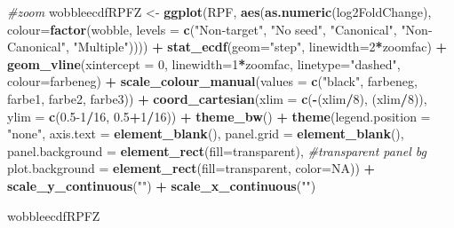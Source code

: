\documentclass[
]{article}
\newenvironment{Shaded}{\begin{snugshade}}{\end{snugshade}}
\newcommand{\AttributeTok}[1]{\textcolor[rgb]{0.13,0.29,0.53}{#1}}
\newcommand{\CommentTok}[1]{\textcolor[rgb]{0.56,0.35,0.01}{\textit{#1}}}
\newcommand{\ConstantTok}[1]{\textcolor[rgb]{0.56,0.35,0.01}{#1}}
\newcommand{\DecValTok}[1]{\textcolor[rgb]{0.00,0.00,0.81}{#1}}
\newcommand{\FloatTok}[1]{\textcolor[rgb]{0.00,0.00,0.81}{#1}}
\newcommand{\FunctionTok}[1]{\textcolor[rgb]{0.13,0.29,0.53}{\textbf{#1}}}
\newcommand{\NormalTok}[1]{#1}
\newcommand{\OtherTok}[1]{\textcolor[rgb]{0.56,0.35,0.01}{#1}}
\newcommand{\SpecialCharTok}[1]{\textcolor[rgb]{0.81,0.36,0.00}{\textbf{#1}}}
\newcommand{\StringTok}[1]{\textcolor[rgb]{0.31,0.60,0.02}{#1}}
\begin{document}
\begin{Shaded}
\begin{Highlighting}[]
\CommentTok{\#zoom}
\NormalTok{wobbleecdfRPFZ }\OtherTok{\textless{}{-}} \FunctionTok{ggplot}\NormalTok{(RPF, }\FunctionTok{aes}\NormalTok{(}\FunctionTok{as.numeric}\NormalTok{(log2FoldChange), }\AttributeTok{colour=}\FunctionTok{factor}\NormalTok{(wobble, }\AttributeTok{levels =} \FunctionTok{c}\NormalTok{(}\StringTok{"Non{-}target"}\NormalTok{, }\StringTok{"No seed"}\NormalTok{, }\StringTok{"Canonical"}\NormalTok{, }\StringTok{"Non{-}Canonical"}\NormalTok{, }\StringTok{"Multiple"}\NormalTok{)))) }\SpecialCharTok{+} 
  \FunctionTok{stat\_ecdf}\NormalTok{(}\AttributeTok{geom=}\StringTok{"step"}\NormalTok{, }\AttributeTok{linewidth=}\DecValTok{2}\SpecialCharTok{*}\NormalTok{zoomfac) }\SpecialCharTok{+}
  \FunctionTok{geom\_vline}\NormalTok{(}\AttributeTok{xintercept =} \DecValTok{0}\NormalTok{, }\AttributeTok{linewidth=}\DecValTok{1}\SpecialCharTok{*}\NormalTok{zoomfac, }\AttributeTok{linetype=}\StringTok{"dashed"}\NormalTok{, }\AttributeTok{colour=}\NormalTok{farbeneg) }\SpecialCharTok{+}
  \FunctionTok{scale\_colour\_manual}\NormalTok{(}\AttributeTok{values =} \FunctionTok{c}\NormalTok{(}\StringTok{"black"}\NormalTok{, farbeneg, farbe1, farbe2, farbe3)) }\SpecialCharTok{+}
  \FunctionTok{coord\_cartesian}\NormalTok{(}\AttributeTok{xlim =} \FunctionTok{c}\NormalTok{(}\SpecialCharTok{{-}}\NormalTok{(xlim}\SpecialCharTok{/}\DecValTok{8}\NormalTok{), (xlim}\SpecialCharTok{/}\DecValTok{8}\NormalTok{)), }\AttributeTok{ylim =} \FunctionTok{c}\NormalTok{(}\FloatTok{0.5}\DecValTok{{-}1}\SpecialCharTok{/}\DecValTok{16}\NormalTok{, }\FloatTok{0.5}\SpecialCharTok{+}\DecValTok{1}\SpecialCharTok{/}\DecValTok{16}\NormalTok{)) }\SpecialCharTok{+} 
  \FunctionTok{theme\_bw}\NormalTok{() }\SpecialCharTok{+}
  \FunctionTok{theme}\NormalTok{(}\AttributeTok{legend.position =} \StringTok{"none"}\NormalTok{, }\AttributeTok{axis.text =} \FunctionTok{element\_blank}\NormalTok{(), }\AttributeTok{panel.grid =} \FunctionTok{element\_blank}\NormalTok{(),}
        \AttributeTok{panel.background =} \FunctionTok{element\_rect}\NormalTok{(}\AttributeTok{fill=}\StringTok{\textquotesingle{}transparent\textquotesingle{}}\NormalTok{), }\CommentTok{\#transparent panel bg}
        \AttributeTok{plot.background =} \FunctionTok{element\_rect}\NormalTok{(}\AttributeTok{fill=}\StringTok{\textquotesingle{}transparent\textquotesingle{}}\NormalTok{, }\AttributeTok{color=}\ConstantTok{NA}\NormalTok{)) }\SpecialCharTok{+}
  \FunctionTok{scale\_y\_continuous}\NormalTok{(}\StringTok{""}\NormalTok{) }\SpecialCharTok{+} \FunctionTok{scale\_x\_continuous}\NormalTok{(}\StringTok{""}\NormalTok{)}


\NormalTok{wobbleecdfRPFZ}
\end{Highlighting}
\end{Shaded}
\end{document}
